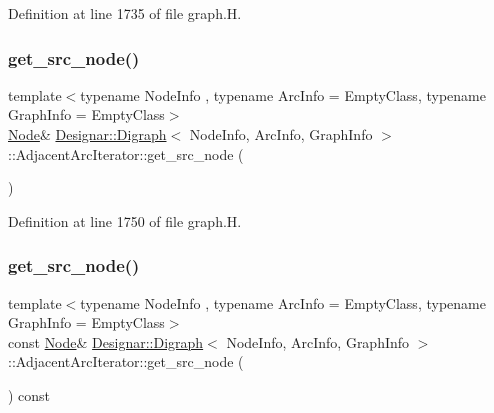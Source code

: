 Definition at line 1735 of file graph.\+H.

\mbox{\label{class_designar_1_1_digraph_1_1_adjacent_arc_iterator_a72e125198f4cea2ab0ac1213c1cbc1e4}} 
\subsubsection{\texorpdfstring{get\+\_\+src\+\_\+node()}{get\_src\_node()}\hspace{0.1cm}{\footnotesize\ttfamily [1/2]}}
{\footnotesize\ttfamily template$<$typename Node\+Info , typename Arc\+Info  = Empty\+Class, typename Graph\+Info  = Empty\+Class$>$ \\
\hyperlink{class_designar_1_1_digraph_a4dc921c41a480b7946a04170e997d8ae}{Node}\& \hyperlink{class_designar_1_1_digraph}{Designar\+::\+Digraph}$<$ Node\+Info, Arc\+Info, Graph\+Info $>$\+::Adjacent\+Arc\+Iterator\+::get\+\_\+src\+\_\+node (\begin{DoxyParamCaption}{ }\end{DoxyParamCaption})\hspace{0.3cm}{\ttfamily [inline]}}



Definition at line 1750 of file graph.\+H.

\mbox{\label{class_designar_1_1_digraph_1_1_adjacent_arc_iterator_a09c51f5124610cd6e5360dc7039b4639}} 
\subsubsection{\texorpdfstring{get\+\_\+src\+\_\+node()}{get\_src\_node()}\hspace{0.1cm}{\footnotesize\ttfamily [2/2]}}
{\footnotesize\ttfamily template$<$typename Node\+Info , typename Arc\+Info  = Empty\+Class, typename Graph\+Info  = Empty\+Class$>$ \\
const \hyperlink{class_designar_1_1_digraph_a4dc921c41a480b7946a04170e997d8ae}{Node}\& \hyperlink{class_designar_1_1_digraph}{Designar\+::\+Digraph}$<$ Node\+Info, Arc\+Info, Graph\+Info $>$\+::Adjacent\+Arc\+Iterator\+::get\+\_\+src\+\_\+node (\begin{DoxyParamCaption}{ }\end{DoxyParamCaption}) const\hspace{0.3cm}{\ttfamily [inline]}}



